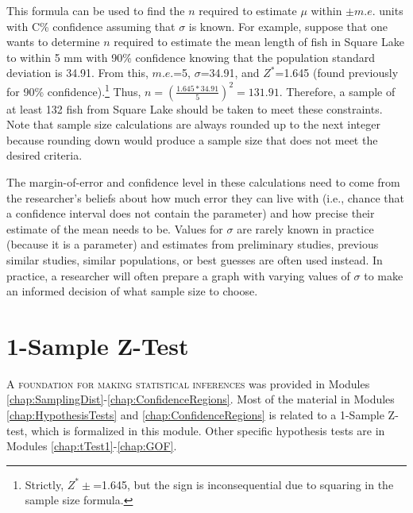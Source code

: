 \documentclass[10pt,openany]{book}\usepackage[]{graphicx}\usepackage[]{color}
\begin{document}
This formula can be used to find the $n$ required to estimate $\mu$ within $\pm m.e.$ units with C\% confidence assuming that $\sigma$ is known. For example, suppose that one wants to determine $n$ required to estimate the mean length of fish in Square Lake to within 5 mm with 90\% confidence knowing that the population standard deviation is 34.91. From this, $m.e.$=5, $\sigma$=34.91, and $Z^{*}$=1.645 (found previously for 90\% confidence).\footnote{Strictly, $Z^{*}\pm$=1.645, but the sign is inconsequential due to squaring in the sample size formula.} Thus, $n = \left(\frac{1.645*34.91}{5}\right)^{2} = 131.91$. Therefore, a sample of at least 132 fish from Square Lake should be taken to meet these constraints. Note that sample size calculations are always rounded up to the next integer because rounding down would produce a sample size that does not meet the desired criteria.


The margin-of-error and confidence level in these calculations need to come from the researcher's beliefs about how much error they can live with (i.e., chance that a confidence interval does not contain the parameter) and how precise their estimate of the mean needs to be. Values for $\sigma$ are rarely known in practice (because it is a parameter) and estimates from preliminary studies, previous similar studies, similar populations, or best guesses are often used instead. In practice, a researcher will often prepare a graph with varying values of $\sigma$ to make an informed decision of what sample size to choose.





\chapter{1-Sample Z-Test} \label{chap:ZTest}

\vspace*{-48pt}
\minitoc
\vspace*{12pt}

\lettrine{A}{ foundation for making statistical inferences} was provided in Modules \ref{chap:SamplingDist}-\ref{chap:ConfidenceRegions}. Most of the material in Modules \ref{chap:HypothesisTests} and \ref{chap:ConfidenceRegions} is related to a 1-Sample Z-test, which is formalized in this module. Other specific hypothesis tests are in Modules \ref{chap:tTest1}-\ref{chap:GOF}.
\end{document}
